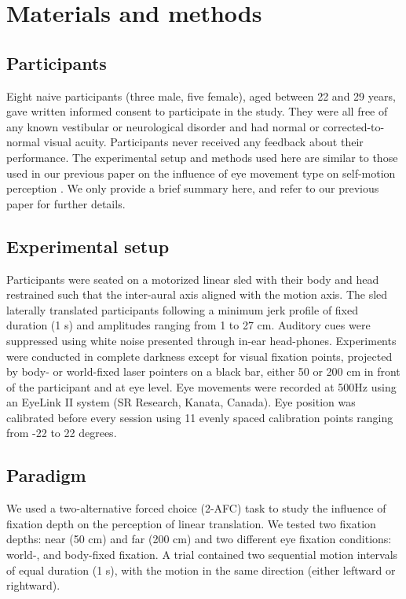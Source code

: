 

\section{Materials and methods}
\label{p4:sec:methods}

\subsection{Participants}

Eight naive participants (three male, five female), aged between 22 and 29 years, gave written informed consent to participate in the study. They were all free of any known vestibular or neurological disorder and had normal or corrected-to-normal visual acuity. Participants never received any feedback about their performance.  The experimental setup and methods used here are similar to those used in our previous paper on the influence of eye movement type on self-motion perception \cite{clemens2015a}. We only provide a brief summary here, and refer to our previous paper for further details.

\subsection{Experimental setup}

Participants were seated on a motorized linear sled with their body and head restrained such that the inter-aural axis aligned with the motion axis. The sled laterally translated participants following a minimum jerk profile of fixed duration (1 \si{\second}) and amplitudes ranging from 1 to 27 \si{\centi\metre}. Auditory cues were suppressed using white noise presented through in-ear head-phones. Experiments were conducted in complete darkness except for visual fixation points, projected by body- or world-fixed laser pointers on a black bar, either 50 or 200 \si{\centi\metre} in front of the participant and at eye level. Eye movements were recorded at 500Hz using an EyeLink II system (SR Research, Kanata, Canada). Eye position was calibrated before every session using 11 evenly spaced calibration points ranging from -22 to 22 degrees.


\subsection{Paradigm}

We used a two-alternative forced choice (2-AFC) task to study the influence of fixation depth on the perception of linear translation. We tested two fixation depths: near (50 \si{\centi\metre}) and far (200 \si{\centi\metre}) and two different eye fixation conditions: world-, and body-fixed fixation. A trial contained two sequential motion intervals of equal duration (1 \si{\second}), with the motion in the same direction (either leftward or rightward).

